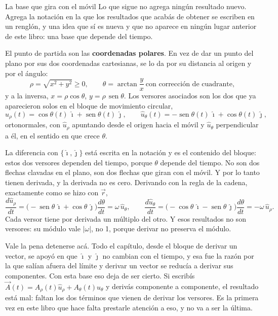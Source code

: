 \documentclass[11pt,openany]{book}
\newcommand{\sen}{\operatorname{sen}}
\begin{document}
\begin{bloque}{La base que gira con el móvil}
Lo que sigue no agrega ningún resultado nuevo. Agrega la notación en la que los resultados que acabás de obtener se escriben en un renglón, y una idea que sí es nueva y que no aparece en ningún lugar anterior de este libro: una base que depende del tiempo.

El punto de partida son las \textbf{coordenadas polares}. En vez de dar un punto del plano por sus dos coordenadas cartesianas, se lo da por su distancia al origen y por el ángulo:
\[
\rho = \sqrt{x^2+y^2} \geq 0, \qquad \theta = \arctan\frac{y}{x} \ \text{con corrección de cuadrante},
\]
y a la inversa, $x = \rho\cos\theta$, $y = \rho\,\sen\theta$. Los versores asociados son los dos que ya aparecieron solos en el bloque de movimiento circular,
\[
\hat u_\rho(t) = \cos\theta(t)\,\hat\imath + \sen\theta(t)\,\hat\jmath, \qquad
\hat u_\theta(t) = -\sen\theta(t)\,\hat\imath + \cos\theta(t)\,\hat\jmath,
\]
ortonormales, con $\hat u_\rho$ apuntando desde el origen hacia el móvil y $\hat u_\theta$ perpendicular a él, en el sentido en que crece $\theta$.

La diferencia con $\{\hat\imath,\hat\jmath\}$ está escrita en la notación y es el contenido del bloque: estos dos versores dependen del tiempo, porque $\theta$ depende del tiempo. No son dos flechas clavadas en el plano, son dos flechas que giran con el móvil. Y por lo tanto tienen derivada, y la derivada no es cero. Derivando con la regla de la cadena, exactamente como se hizo con $\vec r$,
\[
\frac{d\hat u_\rho}{dt} = \big(-\sen\theta\,\hat\imath + \cos\theta\,\hat\jmath\big)\frac{d\theta}{dt} = \omega\,\hat u_\theta,
\qquad
\frac{d\hat u_\theta}{dt} = \big(-\cos\theta\,\hat\imath - \sen\theta\,\hat\jmath\big)\frac{d\theta}{dt} = -\omega\,\hat u_\rho.
\]
Cada versor tiene por derivada un múltiplo del otro. Y esos resultados no son versores: su módulo vale $\lvert\omega\rvert$, no 1, porque derivar no preserva el módulo.

Vale la pena detenerse acá. Todo el capítulo, desde el bloque de derivar un vector, se apoyó en que $\hat\imath$ y $\hat\jmath$ no cambian con el tiempo, y esa fue la razón por la que salían afuera del límite y derivar un vector se reducía a derivar sus componentes. Con esta base eso deja de ser cierto. Si escribís $\vec A(t) = A_\rho(t)\hat u_\rho + A_\theta(t)\hat u_\theta$ y derivás componente a componente, el resultado está mal: faltan los dos términos que vienen de derivar los versores. Es la primera vez en este libro que hace falta prestarle atención a eso, y no va a ser la última.


\end{bloque}
\end{document}
